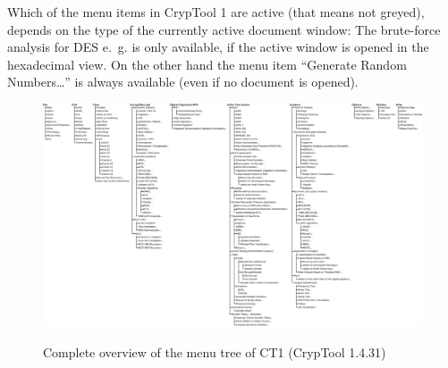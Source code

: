 Which of the menu items in CrypTool 1 are active (that means not greyed),
depends on the type of the currently active document window:
The brute-force analysis for DES e.~g. is only
available, if the active window is opened in the hexadecimal view. 
On the other hand the menu item ``Generate Random Numbers\dots''
is always available (even if no document is opened).



\clearpage
\begin{figure}[hb]
\begin{center}
\vspace{-30pt}
\includegraphics[scale=0.35, angle=270]
                {figures/CT1-menutree-en}
\hypertarget{appendix-figure-menu-overview-CT1}{}
\caption{Complete overview of the menu tree of CT1 (CrypTool 1.4.31)} 
\label{appendix-figure-menu-overview-CT1}
\end{center}
\end{figure}
\clearpage





